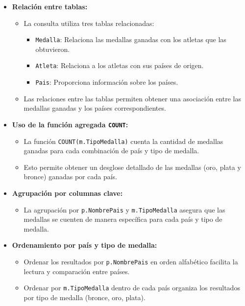 \begin{itemize}
   \item \textbf{Relación entre tablas:}
   \begin{itemize}
       \item La consulta utiliza tres tablas relacionadas:
       \begin{itemize}
           \item \texttt{Medalla}: Relaciona las medallas ganadas con los atletas que las obtuvieron.
           \item \texttt{Atleta}: Relaciona a los atletas con sus países de origen.
           \item \texttt{Pais}: Proporciona información sobre los países.
       \end{itemize}
       \item Las relaciones entre las tablas permiten obtener una asociación entre las medallas ganadas y los países correspondientes.
   \end{itemize}

   \item \textbf{Uso de la función agregada \texttt{COUNT}:}
   \begin{itemize}
       \item La función \texttt{COUNT(m.TipoMedalla)} cuenta la cantidad de medallas ganadas para cada combinación de país y tipo de medalla.
       \item Esto permite obtener un desglose detallado de las medallas (oro, plata y bronce) ganadas por cada país.
   \end{itemize}

   \item \textbf{Agrupación por columnas clave:}
   \begin{itemize}
       \item La agrupación por \texttt{p.NombrePais} y \texttt{m.TipoMedalla} asegura que las medallas se cuenten de manera específica para cada país y tipo de medalla.
   \end{itemize}

   \item \textbf{Ordenamiento por país y tipo de medalla:}
   \begin{itemize}
       \item Ordenar los resultados por \texttt{p.NombrePais} en orden alfabético facilita la lectura y comparación entre países.
       \item Ordenar por \texttt{m.TipoMedalla} dentro de cada país organiza los resultados por tipo de medalla (bronce, oro, plata).
   \end{itemize}
\end{itemize}


